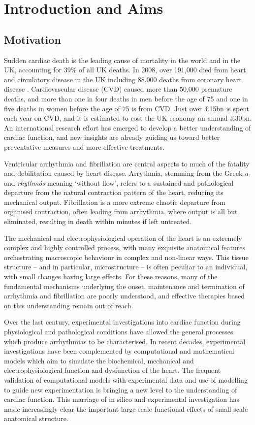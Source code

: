 \chapter{Introduction and Aims}
\dblspace

\section{Motivation}
\label{sec:intro:motivation}
  Sudden cardiac death is the leading cause of mortality in the world and in the UK, accounting for 39\% of all UK deaths. In 2008, over 191,000 died from heart and circulatory disease in the UK including 88,000 deaths
from coronary heart disease \cite{bhf2010}. Cardiovascular disease (CVD) caused more than 50,000 premature deaths, and more than one in four deaths in men before the age of 75 and one in five deaths in women before the age of 75 is from CVD. Just over \pounds15bn is spent each year on CVD, and it is estimated to cost the UK economy an annual \pounds30bn. An international research effort has emerged to develop a better understanding of cardiac function, and new insights are already guiding us toward better preventative measures and more effective treatments.

  Ventricular arrhythmia and fibrillation are central aspects to much of the fatality and debilitation caused by heart disease. Arrythmia, stemming from the Greek \emph{a-} and \emph{rhythm\'os} meaning `without flow', refers to a sustained and pathological departure from the natural contraction pattern of the heart, reducing its mechanical output. Fibrillation is a more extreme chaotic departure from organised contraction, often leading from arrhythmia, where output is all but eliminated, resulting in death within minutes if left untreated.
  
  The mechanical and electrophysiological operation of the heart is an extremely complex and highly controlled process, with many exquisite anatomical features orchestrating macroscopic behaviour in complex and non-linear ways. This tissue structure -- and in particular, microstructure -- is often peculiar to an individual, with small changes having large effects. For these reasons, many of the fundamental mechanisms underlying the onset, maintenance and termination of arrhythmia and fibrillation are poorly understood, and effective therapies based on this understanding remain out of reach.
  
  Over the last century, experimental investigations into cardiac function during physiological and pathological conditions have allowed the general processes which produce arrhythmias to be characterised. In recent decades, experimental investigations have been complemented by computational and mathematical models which aim to simulate the biochemical, mechanical and electrophysiological function and dysfunction of the heart. The frequent validation of computational models with experimental data and use of modelling to guide new experimentation is bringing a new level to the understanding of cardiac function. This marriage of in silico and experimental investigation has made increasingly clear the important large-scale functional effects of small-scale anatomical structure.
  
